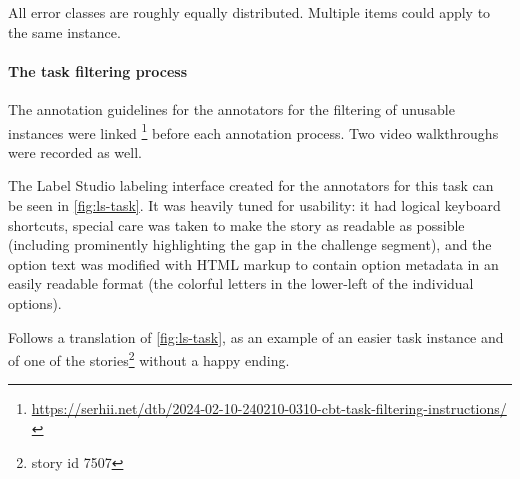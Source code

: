All error classes are roughly equally distributed. 
Multiple items could apply to the same instance.

\paragraph{The task filtering process}
The annotation guidelines for the annotators for the filtering of unusable instances were linked%
\footnote{\href{https://serhii.net/dtb/2024-02-10-240210-0310-cbt-task-filtering-instructions/}{https://serhii.net/dtb/2024-02-10-240210-0310-cbt-task-filtering-instructions/}}
before each annotation process. Two video walkthroughs were recorded as well.

The Label Studio labeling interface created for the annotators for this task can be seen in \autoref{fig:ls-task}. 
It was heavily tuned for usability:  it had logical keyboard shortcuts,  special care was taken to make the story as readable as possible (including prominently highlighting the gap in the challenge segment), and the option text was modified with HTML markup to contain option metadata in an easily readable format (the colorful letters in the lower-left of the individual options).


Follows a translation of \autoref{fig:ls-task}, 
as an example of an easier task instance and of one of the stories\footnote{story id 7507} without a happy ending.

